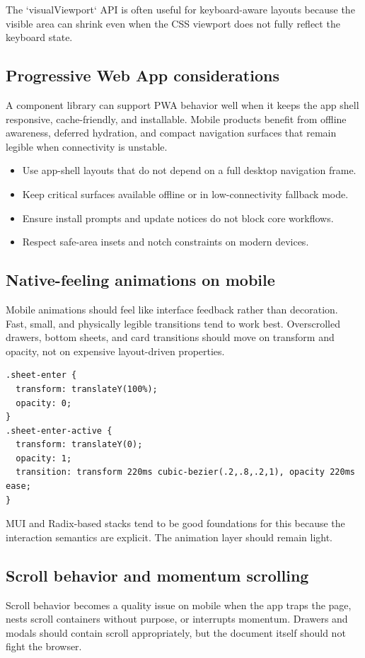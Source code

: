 The `visualViewport` API is often useful for keyboard-aware layouts because the visible area can shrink even when the CSS viewport does not fully reflect the keyboard state.

\subsection{Progressive Web App considerations}
A component library can support PWA behavior well when it keeps the app shell responsive, cache-friendly, and installable. Mobile products benefit from offline awareness, deferred hydration, and compact navigation surfaces that remain legible when connectivity is unstable.

\begin{itemize}[leftmargin=*, itemsep=0.35em]
  \item Use app-shell layouts that do not depend on a full desktop navigation frame.
  \item Keep critical surfaces available offline or in low-connectivity fallback mode.
  \item Ensure install prompts and update notices do not block core workflows.
  \item Respect safe-area insets and notch constraints on modern devices.
\end{itemize}

\subsection{Native-feeling animations on mobile}
Mobile animations should feel like interface feedback rather than decoration. Fast, small, and physically legible transitions tend to work best. Overscrolled drawers, bottom sheets, and card transitions should move on transform and opacity, not on expensive layout-driven properties.

\begin{verbatim}
.sheet-enter {
  transform: translateY(100%);
  opacity: 0;
}
.sheet-enter-active {
  transform: translateY(0);
  opacity: 1;
  transition: transform 220ms cubic-bezier(.2,.8,.2,1), opacity 220ms ease;
}
\end{verbatim}

MUI and Radix-based stacks tend to be good foundations for this because the interaction semantics are explicit. The animation layer should remain light.

\subsection{Scroll behavior and momentum scrolling}
Scroll behavior becomes a quality issue on mobile when the app traps the page, nests scroll containers without purpose, or interrupts momentum. Drawers and modals should contain scroll appropriately, but the document itself should not fight the browser.

